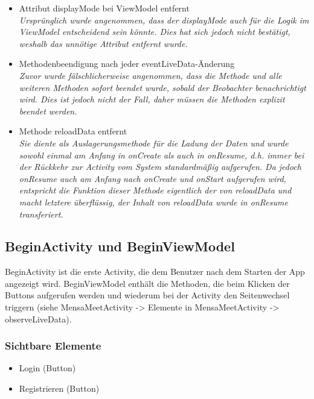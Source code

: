 \documentclass[a4paper]{scrreprt}
\begin{document}
\begin{itemize}
\item Attribut displayMode bei ViewModel entfernt\\
\textit{Ursprünglich wurde angenommen, dass der displayMode auch für die Logik im ViewModel entscheidend sein könnte. Dies hat sich jedoch nicht bestätigt, weshalb das unnötige Attribut entfernt wurde.}
\item Methodenbeendigung nach jeder eventLiveData-Änderung \\
\textit{Zuvor wurde fälschlicherweise angenommen, dass die Methode und alle weiteren Methoden sofort beendet wurde, sobald der Beobachter benachrichtigt wird. Dies ist jedoch nicht der Fall, daher müssen die Methoden explizit beendet werden.}
\item Methode reloadData entfernt\\
\textit{Sie diente als Auslagerungsmethode für die Ladung der Daten und wurde sowohl einmal am Anfang in onCreate als auch in onResume, d.h. immer bei der Rückkehr zur Activity vom System standardmäßig aufgerufen. Da jedoch onResume auch am Anfang nach onCreate und onStart aufgerufen wird, entspricht die Funktion dieser Methode eigentlich der von reloadData und macht letztere überflüssig, der Inhalt von reloadData wurde in onResume transferiert.}
\end{itemize}

\subsection{BeginActivity und BeginViewModel}
BeginActivity ist die erste Activity, die dem Benutzer nach dem Starten der App angezeigt wird. BeginViewModel enthält die Methoden, die beim Klicken der Buttons aufgerufen werden und wiederum bei der Activity den Seitenwechsel triggern (siehe MensaMeetActivity -> Elemente in MensaMeetActivity -> observeLiveData). \\

\subsubsection{Sichtbare Elemente} 
\begin{itemize}
\item Login (Button)
\item Registrieren (Button) \\
\end{itemize}
\end{document}
